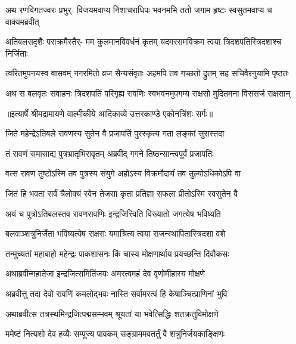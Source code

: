 \fourlineindentedshloka
{अथ रणविगतज्वरः प्रभुर्-}
{विजयमवाप्य निशाचराधिपः}
{भवनमभि ततो जगाम हृष्टः}
{स्वसुतमवाप्य च वाक्यमब्रवीत्} %

\fourlineindentedshloka
{अतिबलसदृशैः पराक्रमैस्तैर्-}
{मम कुलमानविवर्धनं कृतम्}
{यदमरसमविक्रम त्वया}
{त्रिदशपतिस्त्रिदशाश्च निर्जिताः} %

\fourlineindentedshloka
{त्वरितमुपनयस्व वासवम्}
{नगरमितो व्रज सैन्यसंवृतः}
{अहमपि तव गच्छतो द्रुतम्}
{सह सचिवैरनुयामि पृष्ठतः} %

\fourlineindentedshloka
{अथ स बलवृतः सवाहनः}
{त्रिदशपतिं परिगृह्य रावणिः}
{स्वभवनमुपगम्य राक्षसो}
{मुदितमना विससर्ज राक्षसान्} %


{॥इत्यार्षे श्रीमद्रामायणे वाल्मीकीये आदिकाव्ये उत्तरकाण्डे एकोनत्रिंशः सर्गः॥}


\twolineshloka
{जिते महेन्द्रेऽतिबले रावणस्य सुतेन वै}
{प्रजापतिं पुरस्कृत्य गता लङ्कां सुरास्तदा} %

\twolineshloka
{तं रावणं समासाद्य पुत्रभ्रातृभिरावृतम्}
{अब्रवीद् गगने तिष्ठन्सान्त्वपूर्वं प्रजापतिः} %

\twolineshloka
{वत्स रावण तुष्टोऽस्मि तव पुत्रस्य संयुगे}
{अहोऽस्य विक्रमौदार्यं तव तुल्योऽधिकोऽपि वा} %

\twolineshloka
{जितं हि भवता सर्वं त्रैलोक्यं स्वेन तेजसा}
{कृता प्रतिज्ञा सफला प्रीतोऽस्मि स्वसुतेन वै} %

\twolineshloka
{अयं च पुत्रोऽतिबलस्तव रावणरावणिः}
{इन्द्रजित्त्विति विख्यातो जगत्येष भविष्यति} %

\twolineshloka
{बलवाञ्शत्रुनिर्जेता भविष्यत्येष राक्षसः}
{यमाश्रित्य त्वया राजन्स्थापितास्त्रिदशा वशे} %

\twolineshloka
{तन्मुच्यतां महाबाहो महेन्द्रः पाकशासनः}
{किं चास्य मोक्षणार्थाय प्रयच्छन्ति दिवौकसः} %

\twolineshloka
{अथाब्रवीन्महातेजा इन्द्रजित्समितिंजयः}
{अमरत्वमहं देव वृणोमीहास्य मोक्षणे} %

\twolineshloka
{अब्रवीत्तु तदा देवो रावणिं कमलोद्भवः}
{नास्ति सर्वामरत्वं हि केषाञ्चित्प्राणिनां भुवि} %

\twolineshloka
{अथाब्रवीत्स तत्रस्थमिन्द्रजित्पद्मसम्भवम्}
{श्रूयतां या भवेत्सिद्धिः शतक्रतुविमोक्षणे} %

\twolineshloka
{ममेष्टं नित्यशो देव हव्यैः सम्पूज्य पावकम्}
{सङ्ग्राममवतर्तुं वै शत्रुनिर्जयकाङ्क्षिणः} %

